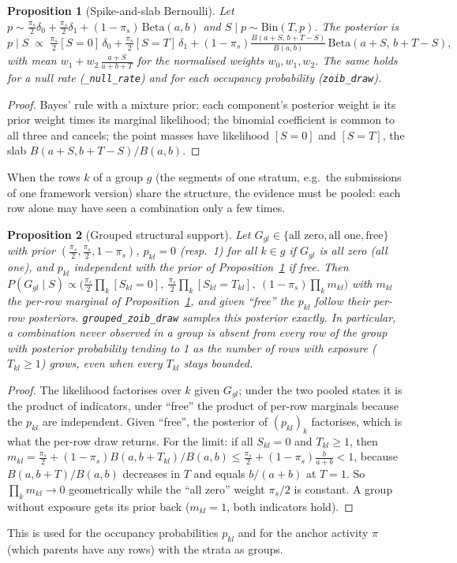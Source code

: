 \documentclass[11pt,a4paper]{article}
\newtheorem{proposition}{Proposition}
\theoremstyle{definition}
\theoremstyle{remark}
\begin{document}
\begin{proposition}[Spike-and-slab Bernoulli]\label{prop:zoib}
Let $p\sim\tfrac{\pi_s}{2}\delta_0+\tfrac{\pi_s}{2}\delta_1+(1-\pi_s)\,\mathrm{Beta}(a,b)$ and $S\mid p\sim\mathrm{Bin}(T,p)$. The posterior is
\[
p\mid S\;\propto\;\tfrac{\pi_s}{2}[S=0]\,\delta_0+\tfrac{\pi_s}{2}[S=T]\,\delta_1+(1-\pi_s)\tfrac{B(a+S,\,b+T-S)}{B(a,b)}\,\mathrm{Beta}(a+S,\,b+T-S),
\]
with mean $w_1+w_2\,\frac{a+S}{a+b+T}$ for the normalised weights $w_0,w_1,w_2$. The same holds for a null rate (\texttt{\_null\_rate}) and for each occupancy probability (\texttt{zoib\_draw}).
\end{proposition}
\begin{proof}
Bayes' rule with a mixture prior: each component's posterior weight is its prior weight times its marginal likelihood; the binomial coefficient is common to all three and cancels; the point masses have likelihood $[S=0]$ and $[S=T]$, the slab $B(a+S,b+T-S)/B(a,b)$.
\end{proof}

When the rows $k$ of a group $g$ (the segments of one stratum, e.g.\ the submissions of one framework version) share the structure, the evidence must be pooled: each row alone may have seen a combination only a few times.
\begin{proposition}[Grouped structural support]\label{prop:grouped}
Let $G_{gl}\in\{\text{all zero},\text{all one},\text{free}\}$ with prior $(\tfrac{\pi_s}{2},\tfrac{\pi_s}{2},1-\pi_s)$, $p_{kl}=0$ (resp.\ 1) for all $k\in g$ if $G_{gl}$ is all zero (all one), and $p_{kl}$ independent with the prior of Proposition~\ref{prop:zoib} if free. Then $P(G_{gl}\mid S)\propto\big(\tfrac{\pi_s}{2}\prod_{k}[S_{kl}=0],\ \tfrac{\pi_s}{2}\prod_k[S_{kl}=T_{kl}],\ (1-\pi_s)\prod_k m_{kl}\big)$ with $m_{kl}$ the per-row marginal of Proposition~\ref{prop:zoib}, and given ``free'' the $p_{kl}$ follow their per-row posteriors. \texttt{grouped\_zoib\_draw} samples this posterior exactly. In particular, a combination never observed in a group is absent from every row of the group with posterior probability tending to 1 as the number of rows with exposure ($T_{kl}\ge1$) grows, even when every $T_{kl}$ stays bounded.
\end{proposition}
\begin{proof}
The likelihood factorises over $k$ given $G_{gl}$; under the two pooled states it is the product of indicators, under ``free'' the product of per-row marginals because the $p_{kl}$ are independent. Given ``free'', the posterior of $(p_{kl})_k$ factorises, which is what the per-row draw returns. For the limit: if all $S_{kl}=0$ and $T_{kl}\ge1$, then $m_{kl}=\tfrac{\pi_s}{2}+(1-\pi_s)B(a,b+T_{kl})/B(a,b)\le\tfrac{\pi_s}{2}+(1-\pi_s)\tfrac{b}{a+b}<1$, because $B(a,b+T)/B(a,b)$ decreases in $T$ and equals $b/(a+b)$ at $T=1$. So $\prod_km_{kl}\to0$ geometrically while the ``all zero'' weight $\pi_s/2$ is constant. A group without exposure gets its prior back ($m_{kl}=1$, both indicators hold).
\end{proof}
\noindent This is used for the occupancy probabilities $p_{kl}$ and for the anchor activity $\pi$ (which parents have any rows) with the strata as groups.
\end{document}
